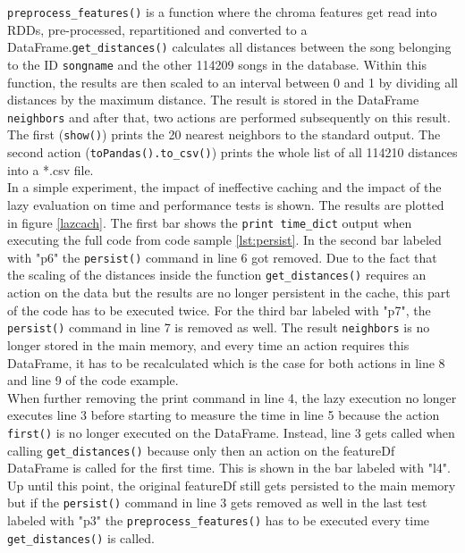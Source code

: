 \noindent \lstinline{preprocess_features()} is a function where the chroma features get read into RDDs, pre-processed, repartitioned and converted to a DataFrame.\lstinline{get_distances()} calculates all distances between the song belonging to the ID \lstinline{songname} and the other 114209 songs in the database. Within this function, the results are then scaled to an interval between 0 and 1 by dividing all distances by the maximum distance. The result is stored in the DataFrame \lstinline{neighbors} and after that, two actions are performed subsequently on this result. The first (\lstinline{show()}) prints the 20 nearest neighbors to the standard output. The second action (\lstinline{toPandas().to_csv()}) prints the whole list of all 114210 distances into a *.csv file.\\
In a simple experiment, the impact of ineffective caching and the impact of the lazy evaluation on time and performance tests is shown. The results are plotted in figure \ref{lazcach}. The first bar shows the \lstinline{print time_dict} output when executing the full code from code sample \ref{lst:persist}. In the second bar labeled with "p6" the \lstinline{persist()} command in line 6 got removed. Due to the fact that the scaling of the distances inside the function \lstinline{get_distances()} requires an action on the data but the results are no longer persistent in the cache, this part of the code has to be executed twice. For the third bar labeled with "p7", the \lstinline{persist()} command in line 7 is removed as well. The result \lstinline{neighbors} is no longer stored in the main memory, and every time an action requires this DataFrame, it has to be recalculated which is the case for both actions in line 8 and line 9 of the code example.\\
When further removing the print command in line 4, the lazy execution no longer executes line 3 before starting to measure the time in line 5 because the action \lstinline{first()} is no longer executed on the DataFrame. Instead, line 3 gets called when calling \lstinline{get_distances()} because only then an action on the featureDf DataFrame is called for the first time. This is shown in the bar labeled with "l4". Up until this point, the original featureDf still gets persisted to the main memory but if the \lstinline{persist()} command in line 3 gets removed as well in the last test labeled with "p3" the \lstinline{preprocess_features()} has to be executed every time \lstinline{get_distances()} is called.  

